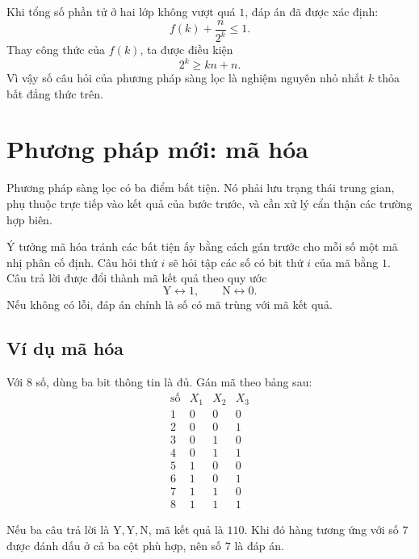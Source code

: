 \documentclass[11pt]{article}
\newcommand{\yes}{\mathrm{Y}}
\newcommand{\no}{\mathrm{N}}
\begin{document}
Khi tổng số phần tử ở hai lớp không vượt quá \(1\), đáp án đã được xác định:
\[
  f(k)+\frac{n}{2^k}\le 1.
\]
Thay công thức của \(f(k)\), ta được điều kiện
\[
  2^k \ge kn+n.
\]
Vì vậy số câu hỏi của phương pháp sàng lọc là nghiệm nguyên nhỏ nhất \(k\)
thỏa bất đẳng thức trên.

\section{Phương pháp mới: mã hóa}

Phương pháp sàng lọc có ba điểm bất tiện. Nó phải lưu trạng thái trung gian,
phụ thuộc trực tiếp vào kết quả của bước trước, và cần xử lý cẩn thận các
trường hợp biên.

Ý tưởng mã hóa tránh các bất tiện ấy bằng cách gán trước cho mỗi số một mã
nhị phân cố định. Câu hỏi thứ \(i\) sẽ hỏi tập các số có bit thứ \(i\) của mã
bằng \(1\). Câu trả lời được đổi thành mã kết quả theo quy ước
\[
  \yes \leftrightarrow 1,\qquad \no \leftrightarrow 0.
\]
Nếu không có lỗi, đáp án chính là số có mã trùng với mã kết quả.

\subsection{Ví dụ mã hóa}

Với \(8\) số, dùng ba bit thông tin là đủ. Gán mã theo bảng sau:
\[
\begin{array}{c|ccc}
\text{số} & X_1 & X_2 & X_3\\ \hline
1 & 0 & 0 & 0\\
2 & 0 & 0 & 1\\
3 & 0 & 1 & 0\\
4 & 0 & 1 & 1\\
5 & 1 & 0 & 0\\
6 & 1 & 0 & 1\\
7 & 1 & 1 & 0\\
8 & 1 & 1 & 1
\end{array}
\]

Nếu ba câu trả lời là \(\yes,\yes,\no\), mã kết quả là \(110\). Khi đó hàng
tương ứng với số \(7\) được đánh dấu ở cả ba cột phù hợp, nên số \(7\) là đáp
án.

\begin{center}
\end{center}
\end{document}
